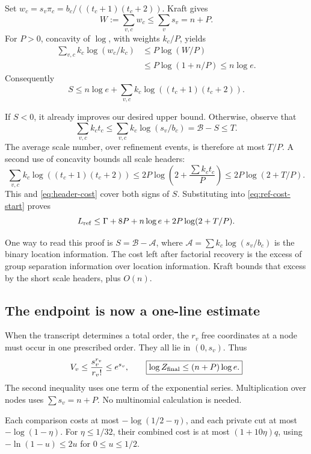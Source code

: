 Set \(w_c=s_v\pi_c=b_c/((t_c+1)(t_c+2))\). Kraft gives
\[
W:=\sum_{v,c}w_c\le\sum_vs_v=n+P.
\]
For \(P>0\), concavity of \(\log\), with weights \(k_c/P\), yields
\begin{align}
\sum_{v,c}k_c\log(w_c/k_c)
&\le P\log(W/P)\nonumber\\
&\le P\log(1+n/P)\le n\log e.\label{eq:logsum}
\end{align}
Consequently
\begin{equation}\label{eq:header-cost}
S\le n\log e+\sum_{v,c}k_c\log((t_c+1)(t_c+2)).
\end{equation}

If \(S<0\), it already improves our desired upper bound. Otherwise, observe that
\[
\sum_{v,c}k_ct_c
\le\sum_{v,c}k_c\log(s_v/b_c)
=\mathcal B-S\le T.
\]
The average scale number, over refinement events, is therefore at most \(T/P\). A second use of concavity bounds all scale headers:
\[
\sum_{v,c}k_c\log((t_c+1)(t_c+2))
\le2P\log\!\left(2+\frac{\sum k_ct_c}{P}\right)
\le2P\log(2+T/P).
\]
This and \eqref{eq:header-cost} cover both signs of \(S\). Substituting into \eqref{eq:ref-cost-start} proves
\begin{equation}\label{eq:ref-cost}
L_{\rm ref}\le
\Gamma+8P+n\log e+2P\log(2+T/P).
\end{equation}

One way to read this proof is \(S=\mathcal B-\mathcal A\), where \(\mathcal A=\sum k_c\log(s_v/b_c)\) is the binary location information. The cost left after factorial recovery is the excess of group separation information over location information. Kraft bounds that excess by the short scale headers, plus \(O(n)\).

\subsection{The endpoint is now a one-line estimate}

When the transcript determines a total order, the \(r_v\) free coordinates at a node must occur in one prescribed order. They all lie in \((0,s_v)\). Thus
\begin{equation}\label{eq:terminal}
V_v\le\frac{s_v^{r_v}}{r_v!}\le e^{s_v},
\qquad
\boxed{\log Z_{\rm final}\le(n+P)\log e.}
\end{equation}
The second inequality uses one term of the exponential series. Multiplication over nodes uses \(\sum s_v=n+P\). No multinomial calculation is needed.

Each comparison costs at most \(-\log(1/2-\eta)\), and each private cut at most \(-\log(1-\eta)\). For \(\eta\le1/32\), their combined cost is at most \((1+10\eta)q\), using \(-\ln(1-u)\le2u\) for \(0\le u\le1/2\).

